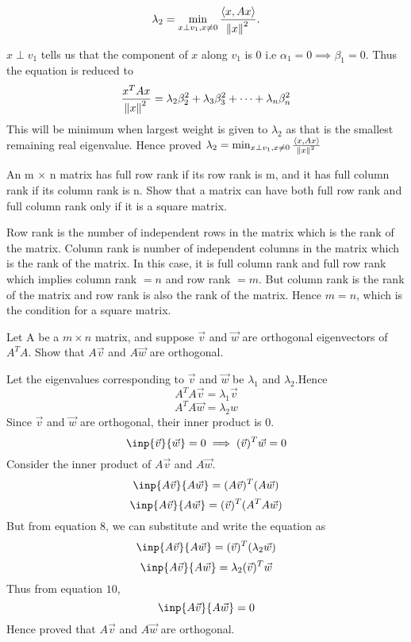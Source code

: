 \documentclass[solution,addpoints,12pt]{exam}
\newenvironment{Solution}{\begin{solution}}{\end{solution}}
\begin{document}
\begin{questions}
\begin{parts}
\begin{equation}
        \lambda_2 = \min_{x \perp v_{1}, x \neq 0} \frac{\langle x, Ax \rangle}{\norm{x}^2}.
    \end{equation}
\begin{Solution}
$x \perp v_{1}$ tells us that the component of $x$ along $v_{1}$ is $0$ i.e $\alpha_{1} = 0 \implies \beta_{1} = 0$. Thus the equation is reduced to 
\[\frac{x^{T}Ax}{\norm{x}^2} = \lambda_{2}\beta_{2}^{2} + \lambda_{3}\beta_{3}^{2} + \dots + \lambda_{n}\beta_{n}^{2}\]
This will be minimum when largest weight is given to $\lambda_{2}$ as that is the smallest remaining real eigenvalue. Hence proved $\lambda_2 = \min_{x \perp v_{1}, x \neq 0} \frac{\langle x, Ax \rangle}{\norm{x}^2}$
\end{Solution}
\end{parts}

\question An m $\times$  n matrix has full row rank if its row rank is m, and it has full column rank if its column rank is n. Show that a matrix can have both full row rank and full column rank only if it is a square matrix.
\begin{Solution}
Row rank is the number of independent rows in the matrix which is the rank of the matrix. Column rank is number of independent columns in the matrix which is the rank of the matrix. In this case, it is full column rank and full row rank which implies column rank $=n$ and row rank $=m$. But column rank is the rank of the matrix and row rank is also the rank of the matrix. Hence $m=n$, which is the condition for a square matrix.
\end{Solution}


\question Let A be a $m\times n$ matrix, and suppose $\vec{v}$ and $\vec{w}$ are orthogonal eigenvectors of $A^{T}A$. Show that $A\vec{v}$ and $A\vec{w}$ are orthogonal.
\begin{Solution}
Let the eigenvalues corresponding to $\vec{v}$ and $\vec{w}$ be $\lambda_{1}$ and $\lambda_{2}$.Hence
\begin{equation}
    A^{T}A\vec{v} = \lambda_{1}\vec{v}
\end{equation}
\begin{equation}
    A^{T}A\vec{w} = \lambda_{2}w
\end{equation}
Since $\vec{v}$ and $\vec{w}$ are orthogonal, their inner product is $0$.
\begin{equation}
    \inp{\vec{v}}{\vec{w}} = 0 \implies (\vec{v})^{T}\vec{w} = 0
\end{equation}
Consider the inner product of $A\vec{v}$ and $A\vec{w}$.
\[\inp{A\vec{v}}{A\vec{w}} = (A\vec{v})^{T}(A\vec{w})\]
\[\inp{A\vec{v}}{A\vec{w}} = (\vec{v})^{T}(A^{T}A\vec{w})\]
But from equation $8$, we can substitute and write the equation as
\[\inp{A\vec{v}}{A\vec{w}} = (\vec{v})^T(\lambda_{2}\vec{w})\]
\[\inp{A\vec{v}}{A\vec{w}} = \lambda_{2}(\vec{v})^{T}\vec{w}\]
Thus from equation $10$, 
\[\inp{A\vec{v}}{A\vec{w}} = 0\]
Hence proved that $A\vec{v}$ and $A\vec{w}$ are orthogonal.
\end{Solution}


\end{questions}
\end{document}
